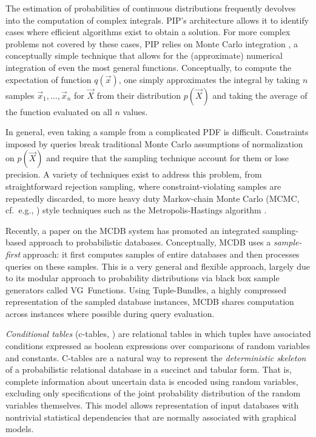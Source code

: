 

The estimation of probabilities of continuous distributions frequently devolves into the computation of complex integrals.  PIP's architecture allows it to identify cases where efficient algorithms exist to obtain a solution.  For more complex problems not covered by these cases, PIP relies on Monte Carlo integration \cite{montecarlo}, a conceptually simple technique that allows for the (approximate) numerical integration of even the most general  functions. Conceptually, to compute the expectation of function $q(\vec x)$, one simply approximates the integral by taking $n$ samples $\vec{x}_1, \dots, \vec{x}_n$ for $\vec{X}$ from their distribution $p(\vec X)$  and  taking  the  average of the function evaluated on all $n$ values.
%

In general, even taking a sample from a complicated PDF is difficult.  Constraints imposed by queries break traditional Monte Carlo assumptions of normalization on $p(\vec X)$ and require that the sampling technique account for them or lose precision.  A variety of techniques exist to address this problem, from straightforward rejection sampling, where constraint-violating samples are repeatedly discarded, to more heavy duty Markov-chain Monte Carlo (MCMC, cf.\ e.g., \cite{GRS1995}) style techniques such as the Metropolis-Hastings algorithm \cite{metropolis,GRS1995}. 

Recently,  a paper on the MCDB system\cite{MCDB} has promoted an integrated sampling-based  approach to  probabilistic databases.  Conceptually,  MCDB uses a {\em sample-first}\/ approach: it   first  computes  samples  of  entire databases and then processes queries  on these samples.  This is a very general and flexible approach, largely due to its modular approach to probability distributions via black box sample generators called VG~Functions.  Using Tuple-Bundles, a highly compressed representation of the sampled database instances, MCDB shares computation across instances where possible during query evaluation.

{\em  Conditional tables}\/  (c-tables, \cite{IL1984})  are relational tables in which tuples have associated conditions expressed as boolean expressions over  comparisons of random variables  and constants. C-tables are a natural way to  represent  the  {\em  deterministic skeleton}\/  of a probabilistic relational  database in  a succinct  and tabular  form.  That  is, complete information  about uncertain data is encoded using random  variables, excluding only  specifications  of the  joint  probability  distribution of  the random  variables   themselves.   This  model   allows  representation of  input databases  with  nontrivial statistical  dependencies that are normally associated with graphical models. 

